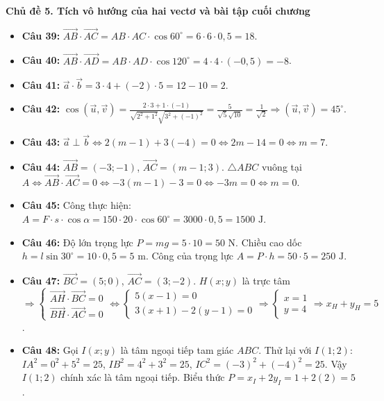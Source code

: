 \documentclass[12pt,a4paper]{article}
\begin{document}
\vspace{0.15cm}
\noindent\textbf{\large Chủ đề 5. Tích vô hướng của hai vectơ và bài tập cuối chương}
\begin{itemize}[leftmargin=1.5em, itemsep=1.8pt]
    \item \textbf{Câu 39:} $\vec{AB} \cdot \vec{AC} = AB \cdot AC \cdot \cos 60^\circ = 6 \cdot 6 \cdot 0{,}5 = 18$.
    \item \textbf{Câu 40:} $\vec{AB} \cdot \vec{AD} = AB \cdot AD \cdot \cos 120^\circ = 4 \cdot 4 \cdot (-0{,}5) = -8$.
    \item \textbf{Câu 41:} $\vec{a} \cdot \vec{b} = 3 \cdot 4 + (-2) \cdot 5 = 12 - 10 = 2$.
    \item \textbf{Câu 42:} $\cos(\vec{u}, \vec{v}) = \frac{2 \cdot 3 + 1 \cdot (-1)}{\sqrt{2^2 + 1^2} \sqrt{3^2 + (-1)^2}} = \frac{5}{\sqrt{5}\sqrt{10}} = \frac{1}{\sqrt{2}} \Rightarrow (\vec{u}, \vec{v}) = 45^\circ$.
    \item \textbf{Câu 43:} $\vec{a} \perp \vec{b} \Leftrightarrow 2(m - 1) + 3(-4) = 0 \Leftrightarrow 2m - 14 = 0 \Leftrightarrow m = 7$.
    \item \textbf{Câu 44:} $\vec{AB} = (-3; -1)$, $\vec{AC} = (m - 1; 3)$. $\triangle ABC$ vuông tại $A \Leftrightarrow \vec{AB} \cdot \vec{AC} = 0 \Leftrightarrow -3(m - 1) - 3 = 0 \Leftrightarrow -3m = 0 \Leftrightarrow m = 0$.
    \item \textbf{Câu 45:} Công thực hiện: $A = F \cdot s \cdot \cos \alpha = 150 \cdot 20 \cdot \cos 60^\circ = 3000 \cdot 0{,}5 = 1500\text{ J}$.
    \item \textbf{Câu 46:} Độ lớn trọng lực $P = mg = 5 \cdot 10 = 50\text{ N}$. Chiều cao dốc $h = l \sin 30^\circ = 10 \cdot 0{,}5 = 5\text{ m}$. Công của trọng lực $A = P \cdot h = 50 \cdot 5 = 250\text{ J}$.
    \item \textbf{Câu 47:} $\vec{BC} = (5; 0)$, $\vec{AC} = (3; -2)$. $H(x; y)$ là trực tâm $\Rightarrow \begin{cases} \vec{AH} \cdot \vec{BC} = 0 \\ \vec{BH} \cdot \vec{AC} = 0 \end{cases} \Leftrightarrow \begin{cases} 5(x - 1) = 0 \\ 3(x + 1) - 2(y - 1) = 0 \end{cases} \Rightarrow \begin{cases} x = 1 \\ y = 4 \end{cases} \Rightarrow x_H + y_H = 5$.
    \item \textbf{Câu 48:} Gọi $I(x; y)$ là tâm ngoại tiếp tam giác $ABC$. Thử lại với $I(1; 2)$: $IA^2 = 0^2 + 5^2 = 25$, $IB^2 = 4^2 + 3^2 = 25$, $IC^2 = (-3)^2 + (-4)^2 = 25$. Vậy $I(1; 2)$ chính xác là tâm ngoại tiếp. Biểu thức $P = x_I + 2y_I = 1 + 2(2) = 5$.

\end{itemize}
\end{document}
